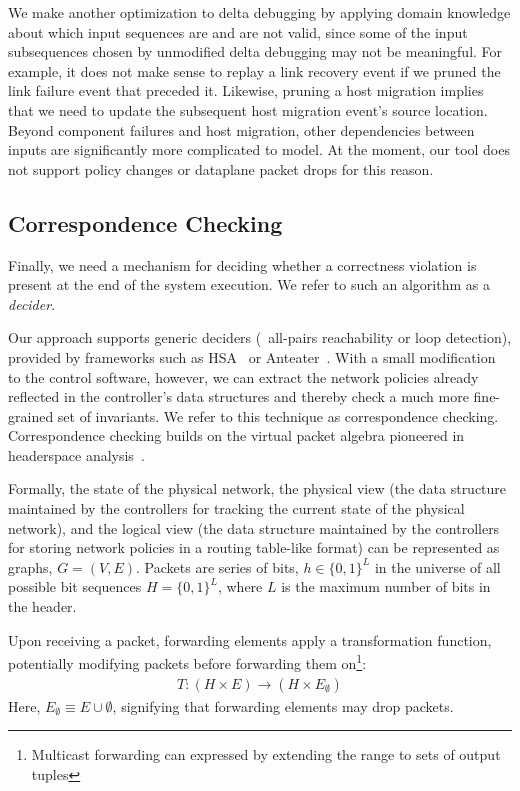 We make another optimization to delta debugging by applying domain knowledge
about which input sequences are and are not valid, since some of the input subsequences
chosen by unmodified delta debugging may not be meaningful. For example, it does not make sense
to replay a link recovery event if we pruned
the link failure event that preceded it. Likewise, pruning a host migration
implies that we need to update the subsequent host migration event's source location.
Beyond component failures and host migration, other dependencies between
inputs are significantly more complicated to model. At the
moment, our tool does not support policy changes or dataplane packet drops for
this reason.



\subsection{Correspondence Checking}
\label{subsec:cc}

Finally, we need a mechanism for deciding
whether a correctness violation is present at the end of the system execution.
We refer to such an algorithm as a {\em decider}.

Our approach supports generic deciders (\eg~all-pairs reachability or loop detection),
provided by frameworks such as HSA~\cite{hsa} or Anteater~\cite{anteater}.
With a small modification to the control software, however, we can
extract the network policies already reflected in the
controller's data structures and thereby check a much more fine-grained set of invariants.
We refer to this technique as correspondence checking. Correspondence checking
builds on the virtual packet algebra
pioneered in headerspace analysis~\cite{hsa}.

Formally, the state of the physical network, the physical view (the
data structure maintained by the controllers for tracking the current state of the physical
network), and the
logical view (the data structure maintained by the controllers for storing
network policies in a routing table-like format) can be represented as graphs,
$G = (V, E)$. Packets are series of bits, $h \in \{0,1\}^L$ in the universe
of all possible bit sequences $H = \{0,1\}^L$,
where $L$ is the maximum number of bits in the header.

Upon receiving a packet,
forwarding elements apply a transformation function, potentially modifying
packets before forwarding them on\footnote{Multicast forwarding can expressed
by extending the range to sets of output tuples}:
\begin{align*}
T: (H \times E) \rightarrow (H \times E_{\emptyset})
\end{align*}
Here, $E_{\emptyset} \equiv E \cup \emptyset$, signifying that forwarding elements
may drop packets.

